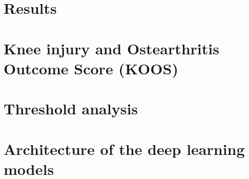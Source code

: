 %

\chapter{Results}



\begingroup
\raggedright



%
%

\endgroup

\appendix

\chapter{\large Knee injury and Ostearthritis Outcome Score (KOOS) \citep{KOOS2016}}\label{app:KOOS}


\chapter{\large Threshold analysis}\label{app:thresholds}


\chapter{\large Architecture of the deep learning models}\label{app:model}



